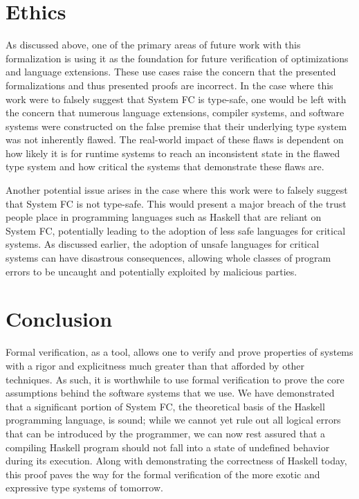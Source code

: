 \documentclass{sig-alternate}
\begin{document}
\section{Ethics}
\label{sec:ethics}

As discussed above, one of the primary areas of future work with this formalization is using it as the foundation for future verification of optimizations and language extensions. These use cases raise the concern that the presented formalizations and thus presented proofs are incorrect. In the case where this work were to falsely suggest that System FC is type-safe, one would be left with the concern that numerous language extensions, compiler systems, and software systems were constructed on the false premise that their underlying type system was not inherently flawed. The real-world impact of these flaws is dependent on how likely it is for runtime systems to reach an inconsistent state in the flawed type system and how critical the systems that demonstrate these flaws are. 

Another potential issue arises in the case where this work were to falsely suggest that System FC is not type-safe. This would present a major breach of the trust people place in programming languages such as Haskell that are reliant on System FC, potentially leading to the adoption of less safe languages for critical systems. As discussed earlier, the adoption of unsafe languages for critical systems can have disastrous consequences, allowing whole classes of program errors to be uncaught and potentially exploited by malicious parties.

\section{Conclusion}
\label{sec:conclusion}

Formal verification, as a tool, allows one to verify and prove properties of systems with a rigor and explicitness much greater than that afforded by other techniques. As such, it is worthwhile to use formal verification to prove the core assumptions behind the software systems that we use. We have demonstrated that a significant portion of System FC, the theoretical basis of the Haskell programming language, is sound; while we cannot yet rule out all logical errors that can be introduced by the programmer, we can now rest assured that a compiling Haskell program should not fall into a state of undefined behavior during its execution. Along with demonstrating the correctness of Haskell today, this proof paves the way for the formal verification of the more exotic and expressive type systems of tomorrow.


\vspace{175pt}
\end{document}

